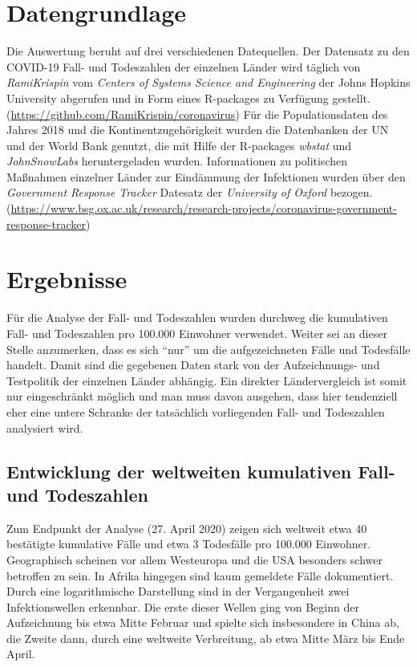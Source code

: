 \documentclass[12pt, a4paper]{article}
\begin{document}
\section{Datengrundlage}
Die Auswertung beruht auf drei verschiedenen Datequellen. Der Datensatz zu den COVID-19 Fall- und Todeszahlen der einzelnen Länder wird täglich von \emph{RamiKrispin} vom \emph{Centers of Systems Science and Engineering} der Johns Hopkins University abgerufen und in Form eines R-packages zu Verfügung gestellt. (\url{https://github.com/RamiKrispin/coronavirus}) Für die Populationsdaten des Jahres 2018 und die Kontinentzugehörigkeit wurden die Datenbanken der UN und der World Bank genutzt, die mit Hilfe der R-packages \emph{wbstat} und \emph{JohnSnowLabs} heruntergeladen wurden.
Informationen zu politischen Maßnahmen einzelner Länder zur Eindämmung der Infektionen wurden über den \emph{Government Response Tracker} Datesatz der \emph{University of Oxford} bezogen. (\url{https://www.bsg.ox.ac.uk/research/research-projects/coronavirus-government-response-tracker})

\section{Ergebnisse}
Für die Analyse der Fall- und Todeszahlen wurden durchweg die kumulativen Fall- und Todeszahlen pro 100.000 Einwohner verwendet. Weiter sei an dieser Stelle anzumerken, dass es sich ``nur'' um die aufgezeichneten Fälle und Todesfälle handelt. Damit sind die gegebenen Daten stark von der Aufzeichnungs- und Testpolitik der einzelnen Länder abhängig. Ein direkter Ländervergleich ist somit nur eingeschränkt möglich und man muss davon ausgehen, dass hier tendenziell eher eine untere Schranke der tatsächlich vorliegenden Fall- und Todeszahlen analysiert wird. 
\subsection{Entwicklung der weltweiten kumulativen Fall- und Todeszahlen}
Zum Endpunkt der Analyse (27. April 2020) zeigen sich weltweit etwa 40 bestätigte kumulative Fälle und etwa 3 Todesfälle pro 100.000 Einwohner. Geographisch scheinen vor allem Westeuropa und die USA besonders schwer betroffen zu sein. In Afrika hingegen sind kaum gemeldete Fälle dokumentiert. Durch eine logarithmische Darstellung sind in der Vergangenheit zwei Infektionswellen erkennbar. Die erste dieser Wellen ging von Beginn der Aufzeichnung bis etwa Mitte Februar und spielte sich insbesondere in China ab, die Zweite dann, durch eine weltweite Verbreitung, ab etwa Mitte März bis Ende April.
\end{document}
